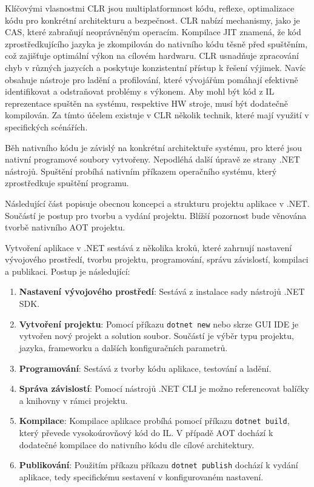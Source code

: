 Klíčovými vlasnostmi CLR jsou multiplatformnost kódu, reflexe, optimalizace kódu pro konkrétní architekturu a bezpečnost. CLR nabízí mechanismy, jako je CAS, které zabraňují neoprávněným operacím. Kompilace JIT znamená, že kód zprostředkujícího jazyka je zkompilován do nativního kódu těsně před spuštěním, což zajišťuje optimální výkon na cílovém hardwaru. CLR usnadňuje zpracování chyb v různých jazycích a poskytuje konzistentní přístup k řešení výjimek. Navíc obsahuje nástroje pro ladění a profilování, které vývojářům pomáhají efektivně identifikovat a odstraňovat problémy s výkonem. Aby mohl být kód z IL reprezentace spuštěn na systému, respektive HW stroje, musí být dodatečně kompilován. Za tímto účelem existuje v CLR několik technik, které mají využití v specifických scénářích. \cite{Richter2012}


Běh nativního kódu je závislý na konkrétní architektuře systému, pro které jsou nativní programové soubory vytvořeny. Nepodléhá další úpravě ze strany .NET nástrojů. Spuštění probíhá nativním příkazem operačního systému, který zprostředkuje spuštění programu.


Následující část popisuje obecnou koncepci a strukturu projektu aplikace v .NET. Součástí je postup pro tvorbu a vydání projektu. Blížší pozornost bude věnována tvorbě nativního AOT projektu.


Vytvoření aplikace v .NET sestává z několika kroků, které zahrnují nastavení vývojového prostředí, tvorbu projektu, programování, správu závislostí, kompilaci a publikaci. Postup je následující:

\begin{enumerate}
    \item \textbf{Nastavení vývojového prostředí}: Sestává z instalace sady nástrojů .NET SDK.
    
    \item \textbf{Vytvoření projektu}: Pomocí příkazu \texttt{dotnet new} nebo skrze GUI IDE je vytvořen nový projekt a solution soubor. Součástí je výběr typu projektu, jazyka, frameworku a dalších konfiguračních parametrů.
    
    \item \textbf{Programování}: Sestává z tvorby kódu aplikace, testování a ladění.

    \item \textbf{Správa závislostí}: Pomocí nástrojů .NET CLI je možno referencovat balíčky a knihovny v rámci projektu.
    
    \item \textbf{Kompilace}: Kompilace aplikace probíhá pomocí příkazu \texttt{dotnet build}, který převede vysokoúrovňový kód do IL. V případě AOT dochází k dodatečné kompilace do nativního kódu dle cílové architektury.
    
    \item \textbf{Publikování}: Použitím příkazu příkazu \texttt{dotnet publish} dochází k vydání aplikace, tedy specifickému sestavení v konfigurovaném nastavení. \cite{Price2023}
\end{enumerate}


